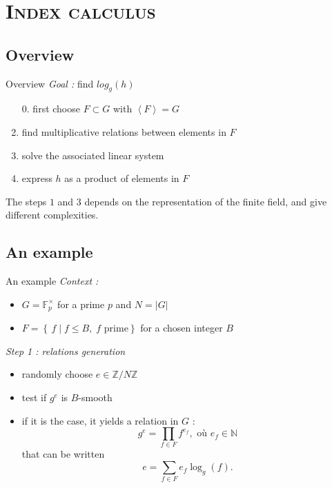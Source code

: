 \documentclass[xcolor=x11names,compress]{beamer}
\theoremstyle{break}
\theoremstyle{sc}
\theoremstyle{definition}
\theoremstyle{remark}
\begin{document}
\section{\scshape Index calculus}
\subsection{Overview}
\begin{frame}{Overview}
  \emph{Goal :} find $log_g(h)$ 
  \begin{enumerate}
    \item[0.] first choose $F\subset
  G$ with $\left\langle F \right\rangle = G$
    \item find multiplicative relations between elements in $F$
    \item solve the associated linear system 
    \item express $h$ as a product of elements in $F$
  \end{enumerate}
  The steps $1$ and $3$ depends on the representation of the finite field, and
  give different complexities.
\end{frame}

\subsection{An example}
\begin{frame}{An example}
  \emph{Context :}
  \begin{itemize}
    \item $G = \mathbb{F}_p^\times$ for a prime $p$ and $N = |G|$
    \item $F = \left\{\, f \;|\; f \leq B,\; f \text{ prime}
    \right\}$ for a chosen integer $B$
  \end{itemize}

  \emph{Step 1 : relations generation}
  \begin{itemize}
    \item randomly choose $e\in \mathbb{Z}/N\mathbb{Z}$
    \item test if $g^e$ is $B$-smooth
    \item if it is the case, it yields a relation in $G$ :
      \[ 
        g^e = \prod_{f\in F}f^{e_f}, \text{ où } e_f\in \mathbb{N}
      \]
      that can be written
      \[
        e = \sum_{f\in F}e_f\log_g(f).
      \]
  \end{itemize}
\end{frame}
\end{document}
